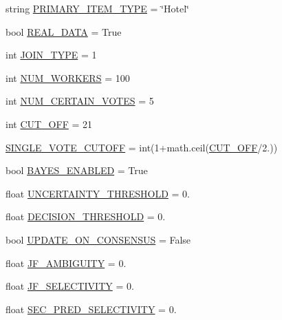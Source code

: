 \begin{DoxyCompactItemize}
\item 
string \mbox{\hyperlink{namespacejoinapp_1_1toggles_aba71a3a07937203e5e7d9b514486f750}{P\+R\+I\+M\+A\+R\+Y\+\_\+\+I\+T\+E\+M\+\_\+\+T\+Y\+PE}} = \char`\"{}Hotel\char`\"{}
\item 
bool \mbox{\hyperlink{namespacejoinapp_1_1toggles_a00674fe8ef8f59b37d7fe239813bb627}{R\+E\+A\+L\+\_\+\+D\+A\+TA}} = True
\item 
int \mbox{\hyperlink{namespacejoinapp_1_1toggles_af6c6a8ec71d33f039345183994e6cc87}{J\+O\+I\+N\+\_\+\+T\+Y\+PE}} = 1
\item 
int \mbox{\hyperlink{namespacejoinapp_1_1toggles_a806fc12166c09fa5baabfcbe218040ae}{N\+U\+M\+\_\+\+W\+O\+R\+K\+E\+RS}} = 100
\item 
int \mbox{\hyperlink{namespacejoinapp_1_1toggles_a157bc167f366f75c9ba8d3e36e8d8540}{N\+U\+M\+\_\+\+C\+E\+R\+T\+A\+I\+N\+\_\+\+V\+O\+T\+ES}} = 5
\item 
int \mbox{\hyperlink{namespacejoinapp_1_1toggles_a914791c176a78c026dc76a18bcd88d73}{C\+U\+T\+\_\+\+O\+FF}} = 21
\item 
\mbox{\hyperlink{namespacejoinapp_1_1toggles_afa8e106b735033b706b1412e12f6783b}{S\+I\+N\+G\+L\+E\+\_\+\+V\+O\+T\+E\+\_\+\+C\+U\+T\+O\+FF}} = int(1+math.\+ceil(\mbox{\hyperlink{namespacejoinapp_1_1toggles_a914791c176a78c026dc76a18bcd88d73}{C\+U\+T\+\_\+\+O\+FF}}/2.))
\item 
bool \mbox{\hyperlink{namespacejoinapp_1_1toggles_adadcb301c2f0066591eaf0a4c08ac96d}{B\+A\+Y\+E\+S\+\_\+\+E\+N\+A\+B\+L\+ED}} = True
\item 
float \mbox{\hyperlink{namespacejoinapp_1_1toggles_aaefdc27b85545eb4a910f5c65f7d8bbb}{U\+N\+C\+E\+R\+T\+A\+I\+N\+T\+Y\+\_\+\+T\+H\+R\+E\+S\+H\+O\+LD}} = 0.
\item 
float \mbox{\hyperlink{namespacejoinapp_1_1toggles_ac4442b6c569574253ef445d09952d3f0}{D\+E\+C\+I\+S\+I\+O\+N\+\_\+\+T\+H\+R\+E\+S\+H\+O\+LD}} = 0.
\item 
bool \mbox{\hyperlink{namespacejoinapp_1_1toggles_ad8aa4e8508e8ec6de895d60b3eaf2b0f}{U\+P\+D\+A\+T\+E\+\_\+\+O\+N\+\_\+\+C\+O\+N\+S\+E\+N\+S\+US}} = False
\item 
float \mbox{\hyperlink{namespacejoinapp_1_1toggles_a069e97b4506f5c485f5d9f90ca601f63}{J\+F\+\_\+\+A\+M\+B\+I\+G\+U\+I\+TY}} = 0.
\item 
float \mbox{\hyperlink{namespacejoinapp_1_1toggles_af81aee8f1e600addf9a632a3f688d6a1}{J\+F\+\_\+\+S\+E\+L\+E\+C\+T\+I\+V\+I\+TY}} = 0.
\item 
float \mbox{\hyperlink{namespacejoinapp_1_1toggles_a20f62d8fa2bdc2837aeba4c1d7a3c9a6}{S\+E\+C\+\_\+\+P\+R\+E\+D\+\_\+\+S\+E\+L\+E\+C\+T\+I\+V\+I\+TY}} = 0.

\end{DoxyCompactItemize}

